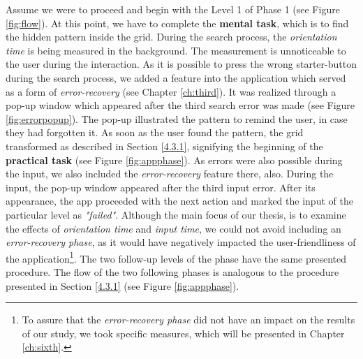 Assume we were to proceed and begin with the Level 1 of Phase 1 (see Figure \ref{fig:flow}). At this point, we have to complete the \textbf{mental task}, which is to find the hidden pattern inside the grid. During the search process, the \textit{orientation time} is being measured in the background. The measurement is unnoticeable to the user during the interaction. As it is possible to press the wrong starter-button during the search process, we added a feature into the application which served as a form of \textit{error-recovery} (see Chapter \ref{ch:third}). It was realized through a pop-up window which appeared after the third search error was made (see Figure \ref{fig:errorpopup}). The pop-up illustrated the pattern to remind the user, in case they had forgotten it. As soon as the user found the pattern, the grid transformed as described in Section \ref{4.3.1}, signifying the beginning of the \textbf{practical task} (see Figure \ref{fig:appphase}). As errors were also possible during the input, we also included the \textit{error-recovery} feature there, also. During the input, the pop-up window appeared after the third input error. After its appearance, the app proceeded with the next action and marked the input of the particular level as \textit{"failed"}. Although the main focus of our thesis, is to examine the effects of \textit{orientation time} and \textit{input time}, we could not avoid including an \textit{error-recovery phase}, as it would have negatively impacted the user-friendliness of the application\footnote{To assure that the \textit{error-recovery phase} did not have an impact on the results of our study, we took specific measures, which will be presented in Chapter \ref{ch:sixth}.}. The two follow-up levels of the phase have the same presented procedure. The flow of the two following phases is analogous to the procedure presented in Section \ref{4.3.1} (see Figure \ref{fig:appphase}).  \\





